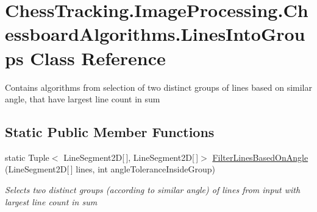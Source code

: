 \hypertarget{class_chess_tracking_1_1_image_processing_1_1_chessboard_algorithms_1_1_lines_into_groups}{}\section{Chess\+Tracking.\+Image\+Processing.\+Chessboard\+Algorithms.\+Lines\+Into\+Groups Class Reference}
\label{class_chess_tracking_1_1_image_processing_1_1_chessboard_algorithms_1_1_lines_into_groups}


Contains algorithms from selection of two distinct groups of lines based on similar angle, that have largest line count in sum  


\subsection*{Static Public Member Functions}
\begin{DoxyCompactItemize}
\item 
static Tuple$<$ Line\+Segment2D\mbox{[}$\,$\mbox{]}, Line\+Segment2D\mbox{[}$\,$\mbox{]}$>$ \mbox{\hyperlink{class_chess_tracking_1_1_image_processing_1_1_chessboard_algorithms_1_1_lines_into_groups_ac4ffd31e5dee74421cfe9255d5144aea}{Filter\+Lines\+Based\+On\+Angle}} (Line\+Segment2D\mbox{[}$\,$\mbox{]} lines, int angle\+Tolerance\+Inside\+Group)
\begin{DoxyCompactList}\small\item\em Selects two distinct groups (according to similar angle) of lines from input with largest line count in sum \end{DoxyCompactList}\end{DoxyCompactItemize}
